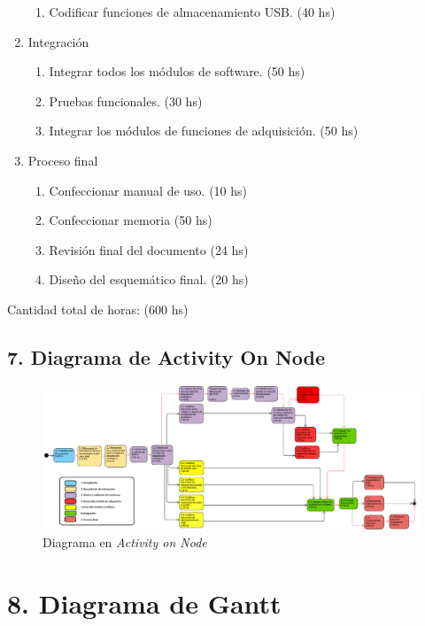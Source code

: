 \documentclass[11pt]{charter}
\begin{document}
\begin{enumerate}
\begin{enumerate}
	\item Codificar funciones de almacenamiento USB. (40 hs)
	\end{enumerate}
\item Integración
	\begin{enumerate}
	\item Integrar todos los módulos de software. (50 hs) 	
	\item Pruebas funcionales.	(30 hs)
	\item Integrar los módulos de funciones de adquisición. (50 hs)
	\end{enumerate}
\item Proceso final
	\begin{enumerate}
	\item Confeccionar manual de uso. (10 hs) 	
	\item Confeccionar memoria (50 hs)
	\item Revisión final del documento (24 hs)
	\item Diseño del esquemático final.	(20 hs)
	\end{enumerate}
\end{enumerate}

Cantidad total de horas: (600 hs)


\begin{landscape}

\section{7. Diagrama de Activity On Node}
\label{sec:AoN}

\begin{figure}[htpb]
\centering 
\includegraphics[width=1.6\textwidth]{./Figuras/AON.png}
\caption{Diagrama en \textit{Activity on Node}}
\label{fig:AoN}
\end{figure}
\end{landscape}

\section{8. Diagrama de Gantt}
\label{sec:gantt}
\end{document}
